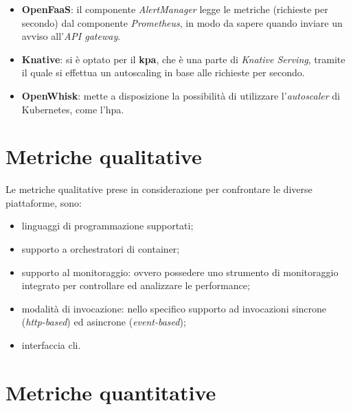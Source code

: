 \documentclass[12pt,a4paper,openany,twoside]{book}
\begin{document}
\begin{itemize}
    \item \textbf{OpenFaaS}: il componente \textit{AlertManager} legge le metriche (richieste per secondo) dal componente \textit{Prometheus}, in modo da sapere quando inviare un avviso all'\textit{API gateway}.
    
    \item \textbf{Knative}: si è optato per il \textbf{\ac{kpa}}, che è una parte di \textit{Knative Serving}, tramite il quale si effettua un autoscaling in base alle richieste per secondo.
    
    \item \textbf{OpenWhisk}: mette a disposizione la possibilità di utilizzare l'\textit{autoscaler} di Kubernetes, come l'\ac{hpa}.
\end{itemize}

\section{Metriche qualitative}
\label{sec:metriche-qualitative}

Le metriche qualitative prese in considerazione per confrontare le diverse piattaforme, sono:
\begin{itemize}
    \item linguaggi di programmazione supportati;
    
    \item supporto a orchestratori di container;
    
    \item supporto al monitoraggio: ovvero possedere uno strumento di monitoraggio integrato per controllare ed analizzare le performance;
    
    \item modalità di invocazione: nello specifico supporto ad invocazioni sincrone (\textit{\ac{http}-based}) ed asincrone (\textit{event-based});
    
    \item interfaccia \ac{cli}.
\end{itemize}


\section{Metriche quantitative}
\label{sec:metriche-quantitative}
\end{document}
